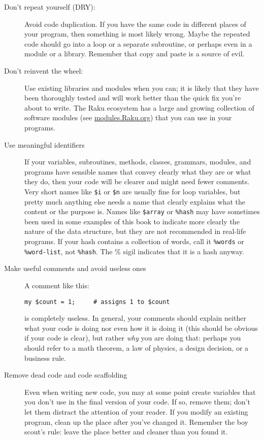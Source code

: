\begin{description}

\item[Don't repeat yourself (DRY):] Avoid code duplication. 
If you have the same code in different places of your 
program, then something is most likely wrong. Maybe 
the repeated code should go into a loop or a separate 
subroutine, or perhaps even in a module or a library. 
Remember that copy and paste is a source of evil.

\item[Don't reinvent the wheel:] Use existing libraries 
and modules when you can; it is likely that they have 
been thoroughly tested and will work better than the 
quick fix you're about to write. The Raku ecosystem 
has a large and growing collection of software modules 
(see \url{modules.Raku.org}) that you can use in your 
programs.

\item[Use meaningful identifiers] If your variables, 
subroutines, methods, classes, grammars, modules, 
and programs have sensible 
names that convey clearly what they are or what they do, 
then your code will be clearer and might need fewer 
comments. Very short names like \verb'$i' or \verb'$n' are 
usually fine for loop variables, but pretty much anything else needs 
a name that clearly explains what the content or the purpose is. 
Names like \verb'$array' or \verb'%hash' may have sometimes been 
used in some examples of this book to indicate more clearly 
the nature of the data structure, but they are not recommended in 
real-life programs. If your hash contains a collection of 
words, call it \verb'%words' or \verb'%word-list', not 
\verb'%hash'. The \% sigil indicates that it is a hash anyway.

\item[Make useful comments and avoid useless ones] A 
comment like this:
\begin{verbatim}
my $count = 1;     # assigns 1 to $count
\end{verbatim}
is completely useless. In general, your comments should 
explain neither what your code is doing nor even how it is doing 
it (this should be obvious if your code is clear), but 
rather \emph{why} you are doing that: perhaps you should refer 
to a math theorem, a law of physics, a design decision, or 
a business rule.

\item[Remove dead code and code scaffolding] Even when 
writing new code, you may at some point create variables 
that you don't use in the final version of your code. If so, 
remove them; don't let them distract the attention of your 
reader. If you modify an existing program, clean up the place 
after you've changed it. Remember the boy scout's rule: 
leave the place better and cleaner than you found it.


\end{description}
